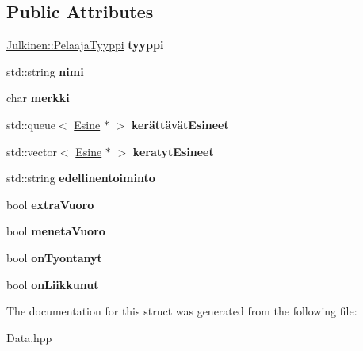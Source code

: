 \subsection*{Public Attributes}
\begin{DoxyCompactItemize}
\item 
\hypertarget{struct_pelaaja_a8d801247c05210f893e2bea4581c2921}{}\hyperlink{namespace_julkinen_ad9a0a9e01af78249f584a93b03db4329}{Julkinen\+::\+Pelaaja\+Tyyppi} {\bfseries tyyppi}\label{struct_pelaaja_a8d801247c05210f893e2bea4581c2921}

\item 
\hypertarget{struct_pelaaja_aa078f73c51dbd0093a15ce3b13799355}{}std\+::string {\bfseries nimi}\label{struct_pelaaja_aa078f73c51dbd0093a15ce3b13799355}

\item 
\hypertarget{struct_pelaaja_a02bdc32a1602c04fc09565dd798bc2ee}{}char {\bfseries merkki}\label{struct_pelaaja_a02bdc32a1602c04fc09565dd798bc2ee}

\item 
\hypertarget{struct_pelaaja_aed59d61a02879aee8e06bcf9444e1c7e}{}std\+::queue$<$ \hyperlink{struct_esine}{Esine} $\ast$ $>$ {\bfseries kerättävät\+Esineet}\label{struct_pelaaja_aed59d61a02879aee8e06bcf9444e1c7e}

\item 
\hypertarget{struct_pelaaja_acdb0a8c22d4c7c53c6f37925166fa894}{}std\+::vector$<$ \hyperlink{struct_esine}{Esine} $\ast$ $>$ {\bfseries keratyt\+Esineet}\label{struct_pelaaja_acdb0a8c22d4c7c53c6f37925166fa894}

\item 
\hypertarget{struct_pelaaja_aa4fca4902c77288a27d0924ca8232653}{}std\+::string {\bfseries edellinentoiminto}\label{struct_pelaaja_aa4fca4902c77288a27d0924ca8232653}

\item 
\hypertarget{struct_pelaaja_a96e6bda620a26db66ccb5abe2dbc4014}{}bool {\bfseries extra\+Vuoro}\label{struct_pelaaja_a96e6bda620a26db66ccb5abe2dbc4014}

\item 
\hypertarget{struct_pelaaja_a6484c51c4abc90f56dcdff8c7ab4cbf6}{}bool {\bfseries meneta\+Vuoro}\label{struct_pelaaja_a6484c51c4abc90f56dcdff8c7ab4cbf6}

\item 
\hypertarget{struct_pelaaja_a0d5674f0d949024ccf3330fe074384f2}{}bool {\bfseries on\+Tyontanyt}\label{struct_pelaaja_a0d5674f0d949024ccf3330fe074384f2}

\item 
\hypertarget{struct_pelaaja_a55e8ede0cb70c5666158146ae563cef2}{}bool {\bfseries on\+Liikkunut}\label{struct_pelaaja_a55e8ede0cb70c5666158146ae563cef2}

\end{DoxyCompactItemize}


The documentation for this struct was generated from the following file\+:\begin{DoxyCompactItemize}
\item 
Data.\+hpp\end{DoxyCompactItemize}
